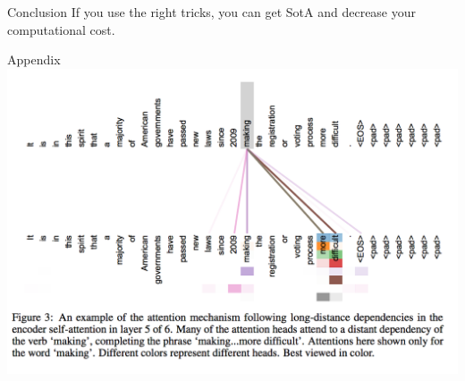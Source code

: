 \documentclass{beamer}
\begin{document}
\begin{frame}{Conclusion}{}
If you use the right tricks, you can get SotA and decrease your computational cost.
\end{frame}
%

\begin{frame}{Appendix}{}
\centering
\includegraphics[width=\linewidth]{img/attn_multi.png}
\end{frame}
%
\end{document}
